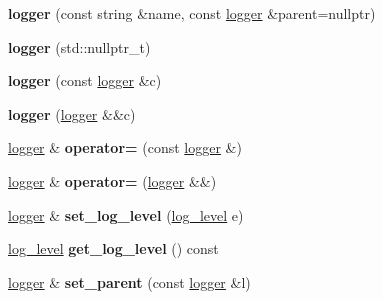 \begin{DoxyCompactItemize}
\item 
\mbox{\label{classfc_1_1logger_a4a01ac75a86de42b725708b5e63474f0}} 
{\bfseries logger} (const string \&name, const \mbox{\hyperlink{classfc_1_1logger}{logger}} \&parent=nullptr)
\item 
\mbox{\label{classfc_1_1logger_aa80401fe80edd1fea76dbea15d01ce76}} 
{\bfseries logger} (std\+::nullptr\+\_\+t)
\item 
\mbox{\label{classfc_1_1logger_a4d5cc2438ad7a1511d57608c64a8380e}} 
{\bfseries logger} (const \mbox{\hyperlink{classfc_1_1logger}{logger}} \&c)
\item 
\mbox{\label{classfc_1_1logger_a27834158456a85aab96d55fe6fac34bc}} 
{\bfseries logger} (\mbox{\hyperlink{classfc_1_1logger}{logger}} \&\&c)
\item 
\mbox{\label{classfc_1_1logger_a393c825c3bde5d27ff565e08ce2035de}} 
\mbox{\hyperlink{classfc_1_1logger}{logger}} \& {\bfseries operator=} (const \mbox{\hyperlink{classfc_1_1logger}{logger}} \&)
\item 
\mbox{\label{classfc_1_1logger_a471fac59f62723ddc452c63f940e5568}} 
\mbox{\hyperlink{classfc_1_1logger}{logger}} \& {\bfseries operator=} (\mbox{\hyperlink{classfc_1_1logger}{logger}} \&\&)
\item 
\mbox{\label{classfc_1_1logger_a4c22e498cec41efb806fda9733662650}} 
\mbox{\hyperlink{classfc_1_1logger}{logger}} \& {\bfseries set\+\_\+log\+\_\+level} (\mbox{\hyperlink{classfc_1_1log__level}{log\+\_\+level}} e)
\item 
\mbox{\label{classfc_1_1logger_ab4ee187ac7a43ba90d16c93da35e9954}} 
\mbox{\hyperlink{classfc_1_1log__level}{log\+\_\+level}} {\bfseries get\+\_\+log\+\_\+level} () const
\item 
\mbox{\label{classfc_1_1logger_a8957908ed8f530c1b97a979552dd19e6}} 
\mbox{\hyperlink{classfc_1_1logger}{logger}} \& {\bfseries set\+\_\+parent} (const \mbox{\hyperlink{classfc_1_1logger}{logger}} \&l)

\end{DoxyCompactItemize}
